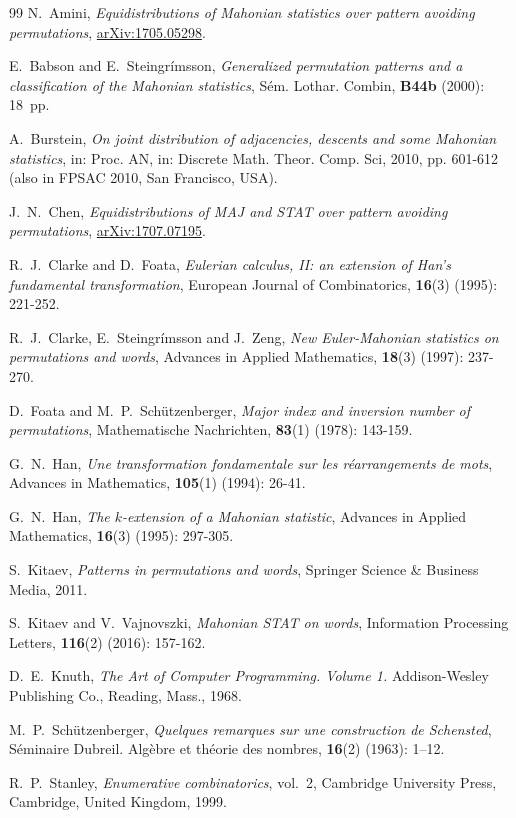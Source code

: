 \documentclass[12pt]{amsart}
\numberwithin{equation}{section}
\theoremstyle{plain}
\theoremstyle{definition}
\begin{document}
\begin{thebibliography}{99}
N.~Amini, \emph{Equidistributions of Mahonian statistics over pattern avoiding permutations}, \href{https://arxiv.org/abs/1705.05298}{arXiv:1705.05298}.

E.~Babson and E.~Steingr\'{i}msson, \emph{Generalized permutation patterns and a classification of the Mahonian statistics}, S\'{e}m. Lothar. Combin, {\bf B44b} (2000): 18~pp.

A.~Burstein, \emph{On joint distribution of adjacencies, descents and some Mahonian statistics}, in: Proc. AN, in: Discrete Math. Theor. Comp. Sci, 2010, pp. 601-612 (also in FPSAC 2010, San Francisco, USA).



J.~N.~Chen, \emph{Equidistributions of MAJ and STAT over pattern avoiding permutations}, \href{https://arxiv.org/abs/1707.07195}{arXiv:1707.07195}.

R.~J.~Clarke and D.~Foata, \emph{Eulerian calculus, II: an extension of Han's fundamental transformation}, European Journal of Combinatorics, {\bf 16}(3) (1995): 221-252.

R.~J.~Clarke, E.~Steingr\'{i}msson and J.~Zeng, \emph{New Euler-Mahonian statistics on permutations and words}, Advances in Applied Mathematics, {\bf 18}(3) (1997): 237-270.


D.~Foata and M.~P.~Sch\"{u}tzenberger, \emph{Major index and inversion number of permutations}, Mathematische Nachrichten, {\bf 83}(1) (1978): 143-159.


G.~N.~Han, \emph{Une transformation fondamentale sur les r\'{e}arrangements de mots}, Advances in Mathematics, {\bf 105}(1) (1994): 26-41.

G.~N.~Han, \emph{The $k$-extension of a Mahonian statistic}, Advances in Applied Mathematics, {\bf 16}(3) (1995): 297-305.

S.~Kitaev, \emph{Patterns in permutations and words}, Springer Science \& Business Media, 2011.

S.~Kitaev and V.~Vajnovszki, \emph{Mahonian STAT on words}, Information Processing Letters, {\bf 116}(2) (2016): 157-162.

D.~E.~Knuth, \emph{The Art of Computer Programming. Volume 1.} Addison-Wesley Publishing Co., Reading, Mass., 1968.

M.~P.~Sch\"{u}tzenberger, \emph{Quelques remarques sur une construction de Schensted}, S\'{e}minaire Dubreil. Alg\`{e}bre et th\'{e}orie des nombres, {\bf 16}(2) (1963): 1--12.



R.~P.~Stanley, \emph{Enumerative combinatorics}, vol.~2, Cambridge University Press, Cambridge, United Kingdom, 1999.


\end{thebibliography}
\end{document}
